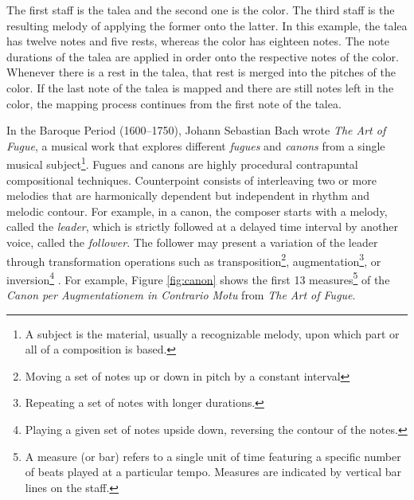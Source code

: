 The first staff is the talea and the second one is the color. The third staff is the resulting melody of applying the former onto the latter. In this example, the talea has twelve notes and five rests, whereas the color has eighteen notes. The note durations of the talea are applied in order onto the respective notes of the color. Whenever there is a rest in the talea, that rest is merged into the pitches of the color. If the last note of the talea is mapped and there are still notes left in the color, the mapping process continues from the first note of the talea.

In the Baroque Period (1600--1750), Johann Sebastian Bach wrote \textit{The Art of Fugue}, a musical work that explores different \textit{fugues} and \textit{canons} from a single musical subject\footnote{A subject is the material, usually a recognizable melody, upon which part or all of a composition is based.}. Fugues and canons are highly procedural contrapuntal compositional techniques. Counterpoint consists of interleaving two or more melodies that are harmonically dependent but independent in rhythm and melodic contour. For example, in a canon, the composer starts with a melody, called the \textit{leader}, which is strictly followed at a delayed time interval by another voice, called the \textit{follower}. The follower may present a variation of the leader through transformation operations such as transposition\footnote{Moving a set of notes up or down in pitch by a constant interval}, augmentation\footnote{Repeating a set of notes with longer durations.}, or inversion\footnote{Playing a given set of notes upside down, reversing the contour of the notes.} \cite{simoni2003algorithmic}. For example, Figure \ref{fig:canon} shows the first 13 measures\footnote{A measure (or bar) refers to a single unit of time featuring a specific number of beats played at a particular tempo. Measures are indicated by vertical bar lines on the staff.} of the \textit{Canon per Augmentationem in Contrario Motu} from \textit{The Art of Fugue}.

